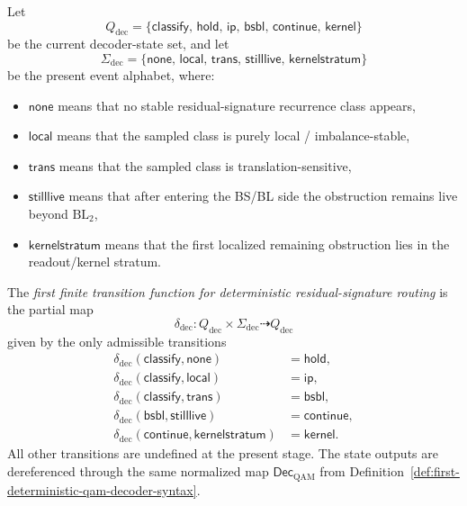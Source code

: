 \begin{definition}
\label{def:first-finite-transition-function-deterministic-decoder}
Let
\[
Q_{\mathrm{dec}}=\bigl\{\mathsf{classify},\,\mathsf{hold},\,\mathsf{ip},\,\mathsf{bsbl},\,\mathsf{continue},\,\mathsf{kernel}\bigr\}
\]
be the current decoder-state set, and let
\[
\Sigma_{\mathrm{dec}}=\bigl\{\mathsf{none},\,\mathsf{local},\,\mathsf{trans},\,\mathsf{stilllive},\,\mathsf{kernelstratum}\bigr\}
\]
be the present event alphabet, where:
\begin{itemize}[leftmargin=2em]
    \item \(\mathsf{none}\) means that no stable residual-signature recurrence class appears,
    \item \(\mathsf{local}\) means that the sampled class is purely local / imbalance-stable,
    \item \(\mathsf{trans}\) means that the sampled class is translation-sensitive,
    \item \(\mathsf{stilllive}\) means that after entering the BS/BL side the obstruction remains live beyond \(\mathrm{BL}_2\),
    \item \(\mathsf{kernelstratum}\) means that the first localized remaining obstruction lies in the readout/kernel stratum.
\end{itemize}
The \emph{first finite transition function for deterministic residual-signature routing} is the partial map
\[
\delta_{\mathrm{dec}}:Q_{\mathrm{dec}}\times \Sigma_{\mathrm{dec}}\dashrightarrow Q_{\mathrm{dec}}
\]
given by the only admissible transitions
\[
\begin{aligned}
\delta_{\mathrm{dec}}(\mathsf{classify},\mathsf{none})&=\mathsf{hold},\\
\delta_{\mathrm{dec}}(\mathsf{classify},\mathsf{local})&=\mathsf{ip},\\
\delta_{\mathrm{dec}}(\mathsf{classify},\mathsf{trans})&=\mathsf{bsbl},\\
\delta_{\mathrm{dec}}(\mathsf{bsbl},\mathsf{stilllive})&=\mathsf{continue},\\
\delta_{\mathrm{dec}}(\mathsf{continue},\mathsf{kernelstratum})&=\mathsf{kernel}.
\end{aligned}
\]
All other transitions are undefined at the present stage. The state outputs are dereferenced through the same normalized map \(\mathsf{Dec}_{\mathrm{QAM}}\) from Definition~\ref{def:first-deterministic-qam-decoder-syntax}.
\end{definition}

